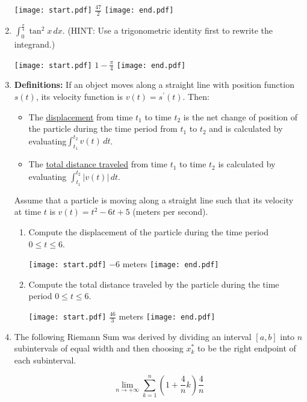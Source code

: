 \documentclass[12pt]{article}
\begin{document}
\begin{enumerate}
\texttt{[image: start.pdf]}
{{$\frac{47}{2}$}}
\texttt{[image: end.pdf]}


\item $\int_0^{\frac{\pi}{4}} \tan^2{x} \,dx$.  (HINT: Use a trigonometric identity first to rewrite the integrand.)

\texttt{[image: start.pdf]}
{{$1-\frac{\pi}{4}$}}
\texttt{[image: end.pdf]}


\item {\bf Definitions:} If an object moves along a straight line with position function $s(t)$, its velocity function is $v(t)=s^{\prime}(t)$.  Then:

\begin{itemize}

\item The \underline{displacement} from time $t_1$ to time $t_2$ is the net change of position of the particle during the time period from $t_1$ to $t_2$ and is calculated by evaluating$\int_{t_1}^{t_2} v(t) \,dt$.

\item The \underline{total distance traveled} from time $t_1$ to time $t_2$ is calculated by evaluating $\int_{t_1}^{t_2} |v(t)| \,dt$.

\end{itemize}

Assume that a particle is moving along a straight line such that its velocity at time $t$ is $v(t)=t^2-6t+5$  (meters per second).  
\begin{enumerate}

\item Compute the displacement of the particle during the time period $0 \leq t \leq 6$.

\texttt{[image: start.pdf]}
{{$-6$ meters}}
\texttt{[image: end.pdf]}


\item Compute the total distance traveled by the particle during the time period $0 \leq t \leq 6$.

\texttt{[image: start.pdf]}
{{$\frac{46}{3}$ meters}}
\texttt{[image: end.pdf]}


\end{enumerate}

\item The following Riemann Sum was derived by dividing an interval $[a,b]$ into $n$ subintervals of equal width and then choosing $x_k^*$ to be the right endpoint of each subinterval.

$$\lim_{n \rightarrow +\infty} \sum_{k=1}^n{\left(1+\frac{4}{n}k\right)\frac{4}{n}}$$


\end{enumerate}
\end{document}
